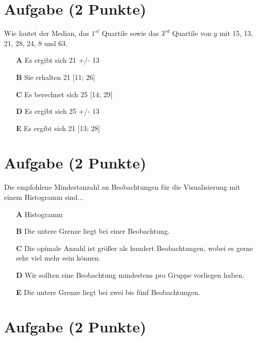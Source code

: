 \documentclass[a4paper, 9pt]{scrartcl}\usepackage[]{graphicx}\usepackage[]{xcolor}
\begin{document}
\section{Aufgabe \hfill (2 Punkte)}




Wie lautet der Median, das $1^{st}$ Quartile sowie das $3^{rd}$ Quartile von $y$ mit 15, 13, 21, 28, 24, 8 und 63.




\begin{enumerate}
\item [\textbf{A} \msquare] Es ergibt sich 21 +/- 13
\item [\textbf{B} \msquare] Sie erhalten 21 [11; 26]
\item [\textbf{C} \msquare] Es berechnet sich 25 [14; 29]
\item [\textbf{D} \msquare] Es ergibt sich 25 +/- 13
\item [\textbf{E} \msquare] Es ergibt sich 21 [13; 28]
\end{enumerate} 

\section{Aufgabe \hfill (2 Punkte)}



Die empfohlene Mindestanzahl an Beobachtungen für die Visualisierung mit einem Histogramm sind...



\begin{enumerate}
\item [\textbf{A} \msquare] Histogramm
\item [\textbf{B} \msquare] Die untere Grenze liegt bei einer Beobachtung.
\item [\textbf{C} \msquare] Die opimale Anzahl ist größer als hundert Beobachtungen, wobei es gerne sehr viel mehr sein können.
\item [\textbf{D} \msquare] Wir sollten eine Beobachtung mindestens pro Gruppe vorliegen haben.
\item [\textbf{E} \msquare] Die untere Grenze liegt bei zwei bis fünf Beobachtungen.
\end{enumerate}

\section{Aufgabe \hfill (2 Punkte)}
\end{document}
